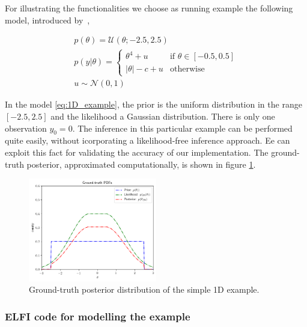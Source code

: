 For illustrating the functionalities we choose as running
example the following model, introduced by~\autocite{Ikonomov2019},

\begin{gather} \label{eq:1D_example}
  p(\theta) = \mathcal{U}(\theta;-2.5,2.5)\\
  p(y|\theta) = 
  \left\{
    \begin{array}{ll}
      \theta^4 + u & \mbox{if } \theta \in [-0.5, 0.5] \\
      |\theta| - c + u & \mbox{otherwise} 
    \end{array} \right.\\
  u \sim \mathcal{N}(0,1)
\end{gather}

\noindent

In the model \eqref{eq:1D_example}, the prior is the uniform
distribution in the range $[-2.5, 2.5]$ and the likelihood a Gaussian
distribution. There is only one observation $y_0 = 0$. The inference
in this particular example can be performed quite easily, without
icorporating a likelihood-free inference approach. Ee can exploit this
fact for validating the accuracy of our implementation. The
ground-truth posterior, approximated computationally, is shown in
figure \ref{fig:example_gt}.

\begin{figure}[h]
    \begin{center}
      \includegraphics[width=0.5\textwidth]{./Thesis/images/chapter3/example_gt.png}
    \end{center}
  \caption[Ground-truth posterior distribution of the simple 1D example.]{Ground-truth posterior distribution of the simple 1D example.}
  \label{fig:example_gt}
\end{figure}

\subsubsection*{ELFI code for modelling the example}

